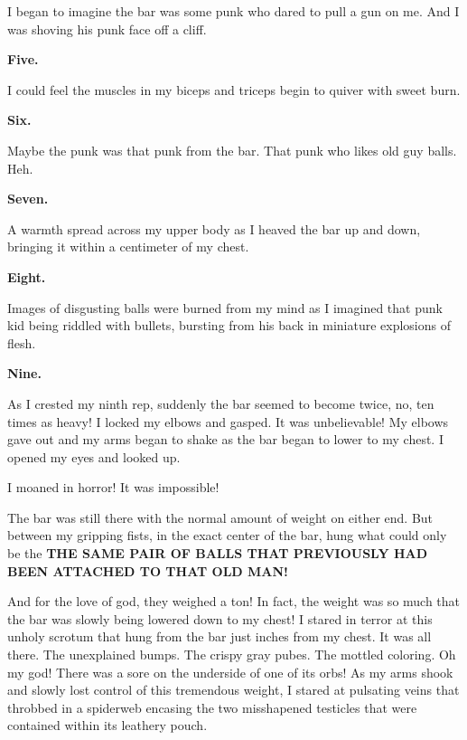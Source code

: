 I began to imagine the bar was some punk who dared to pull a gun on
me. And I was shoving his punk face off a cliff.



{\bf Five.}



I could feel the muscles in my biceps and triceps begin to quiver
with sweet burn.



{\bf Six.}



Maybe the punk was that punk from the bar. That punk who likes old
guy balls. Heh.



{\bf Seven.}



A warmth spread across my upper body as I heaved the bar up and
down, bringing it within a centimeter of my chest.



{\bf Eight.}



Images of disgusting balls were burned from my mind as I imagined
that punk kid being riddled with bullets, bursting from his back in
miniature explosions of flesh.



{\bf Nine.}



As I crested my ninth rep, suddenly the bar seemed to become twice,
no, ten times as heavy! I locked my elbows and gasped. It was
unbelievable! My elbows gave out and my arms began to shake as the
bar began to lower to my chest. I opened my eyes and looked
up.



I moaned in horror! It was impossible!



The bar was still there with the normal amount of weight on either
end. But between my gripping fists, in the exact center of the bar,
hung what could only be the {\bf THE SAME PAIR OF BALLS THAT
PREVIOUSLY HAD BEEN ATTACHED TO THAT OLD MAN!}



And for the love of god, they weighed a ton! In fact, the weight
was so much that the bar was slowly being lowered down to my chest!
I stared in terror at this unholy scrotum that hung from the bar
just inches from my chest. It was all there. The unexplained bumps.
The crispy gray pubes. The mottled coloring. Oh my god! There was a
sore on the underside of one of its orbs! As my arms shook and
slowly lost control of this tremendous weight, I stared at
pulsating veins that throbbed in a spiderweb encasing the two
misshapened testicles that were contained within its leathery
pouch.



